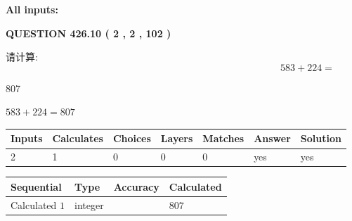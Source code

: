 \documentclass{ctexart}
\begin{document}
   
   
   
\noindent\vspace{0.1in}\hspace{-0.08in} {\textbf{\Large{All inputs: }}}
   
   
  
\vspace{0.2in}
  
{\textbf{\Large{QUESTION
426.10 
 ( 2 , 2 , 102 )
}}}
  
  
 
请计算:
\begin{equation}
583 +  %
224 = \nonumber
\end{equation}
 
 
 
\noindent{}
 
 

807
 
 
\noindent{}
 
 

 
 
 
\noindent{}
 
 

$ %
583 +  %
224=   %
807$
 
 
\noindent{}
 
 

 
   
   
   
   
\noindent\begin{tabular}{|l|l|l|l|l|l|l|}
 \hline
Inputs & Calculates & Choices & Layers & Matches & Answer & Solution \\ \hline
 2  & 
 1  & 
 0
  & 
 0  & 
 0  & 
  yes & 
  yes 
  \\ \hline
 \end{tabular}
   
   
   
   
\noindent{}
   
   
  
  
\noindent\begin{tabular}{|l|l|l|l|}
\hline
 Sequential & Type & Accuracy & Calculated \\ 
\hline
 
 
  Calculated $  1 $ & integer &  & 
  $ 807 $ 
 \\  \hline  
 \end{tabular}
   
\end{document}
